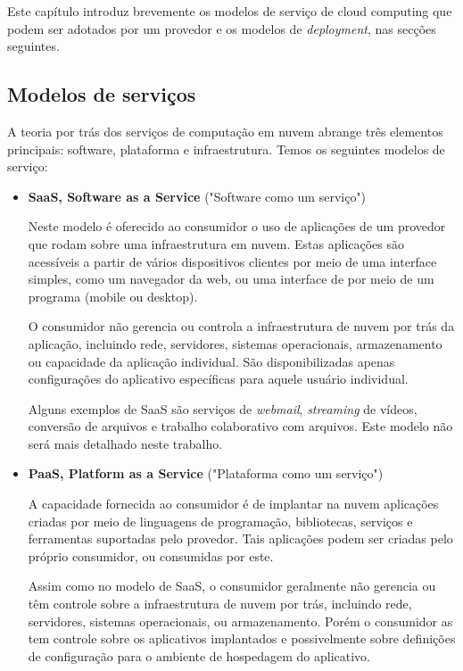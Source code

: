 Este capítulo introduz brevemente os modelos de serviço de cloud computing que podem ser adotados por um provedor e os modelos de \textit{deployment}, nas secções seguintes.

\subsection{Modelos de serviços}

A teoria por trás dos serviços de computação em nuvem abrange três elementos principais: software, plataforma e infraestrutura. Temos os seguintes modelos de serviço:

\begin{itemize}
  \item \textbf{SaaS, Software as a Service} ("Software como um serviço") 

  Neste modelo é oferecido ao consumidor o uso de aplicações de um provedor que rodam sobre uma infraestrutura em nuvem. Estas aplicações são acessíveis a partir de vários dispositivos clientes por meio de uma interface simples, como um navegador da web, ou uma interface de por meio de um programa (mobile ou desktop). 

  O consumidor não gerencia ou controla a infraestrutura de nuvem por trás da aplicação, incluindo rede, servidores, sistemas operacionais, armazenamento ou capacidade da aplicação individual. São disponibilizadas apenas configurações do aplicativo específicas para aquele usuário individual.

  Alguns exemplos de SaaS são serviços de \textit{webmail}, \textit{streaming} de vídeos, conversão de arquivos e trabalho colaborativo com arquivos. Este modelo não será mais detalhado neste trabalho.

  \item \textbf{PaaS, Platform as a Service} ("Plataforma como um serviço") 

  A capacidade fornecida ao consumidor é de implantar na nuvem aplicações criadas por meio de linguagens de programação, bibliotecas, serviços e ferramentas suportadas pelo provedor. Tais aplicações podem ser criadas pelo próprio consumidor, ou consumidas por este.

  Assim como no modelo de SaaS, o consumidor geralmente não gerencia ou têm controle sobre a infraestrutura de nuvem por trás, incluindo rede, servidores, sistemas operacionais, ou armazenamento. Porém o consumidor as tem controle sobre os aplicativos implantados e possivelmente sobre definições de configuração para o ambiente de hospedagem do aplicativo.


\end{itemize}

